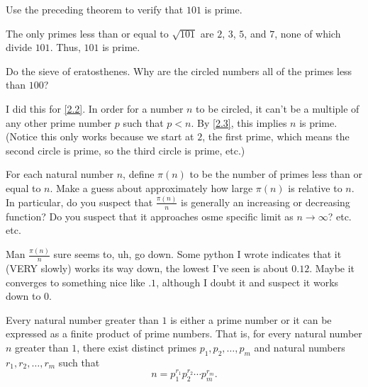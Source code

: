 \documentclass[../main.tex]{subfiles}
\begin{document}
\begin{ex} \label{2.4}
  Use the preceding theorem to verify that $101$ is prime.
\end{ex}

The only primes less than or equal to $\sqrt{101}$ are $2$, $3$, $5$, and $7$, none of which divide $101$. Thus, $101$ is prime.



\begin{ex} \label{2.5}
  Do the sieve of eratosthenes. Why are the circled numbers all of the primes less than $100$?
\end{ex}

I did this for \ref{2.2}. In order for a number $n$ to be circled, it can't be a multiple of any other prime number $p$ such that $p < n$. By \ref{2.3}, this implies $n$ is prime. (Notice this only works because we start at $2$, the first prime, which means the second circle is prime, so the third circle is prime, etc.)



\begin{ex} \label{2.6}
  For each natural number $n$, define $\pi (n)$ to be the number of primes less than or equal to $n$. Make a guess about approximately how large $\pi (n)$ is relative to $n$. In particular, do you suspect that $\frac{\pi (n)}{n}$ is generally an increasing or decreasing function? Do you suspect that it approaches osme specific limit as $n \to \infty$? etc. etc.
\end{ex}

Man $\frac{\pi (n)}{n}$ sure seems to, uh, go down. Some python I wrote indicates that it (VERY slowly) works its way down, the lowest I've seen is about $0.12$. Maybe it converges to something nice like $.1$, although I doubt it and suspect it works down to $0$.



 \begin{thm} \label{2.7}
   Every natural number greater than $1$ is either a prime number or it can be expressed as a finite product of prime numbers. That is, for every natural number $n$ greater than $1$, there exist distinct primes $p_1, p_2, \ldots, p_m$ and natural numbers $r_1,r_2,\ldots,r_m$ such that
   $$n = p_1^{r_1} p_2^{r_2} \cdots p_m^{r_m}.$$
 \end{thm}
\end{document}
